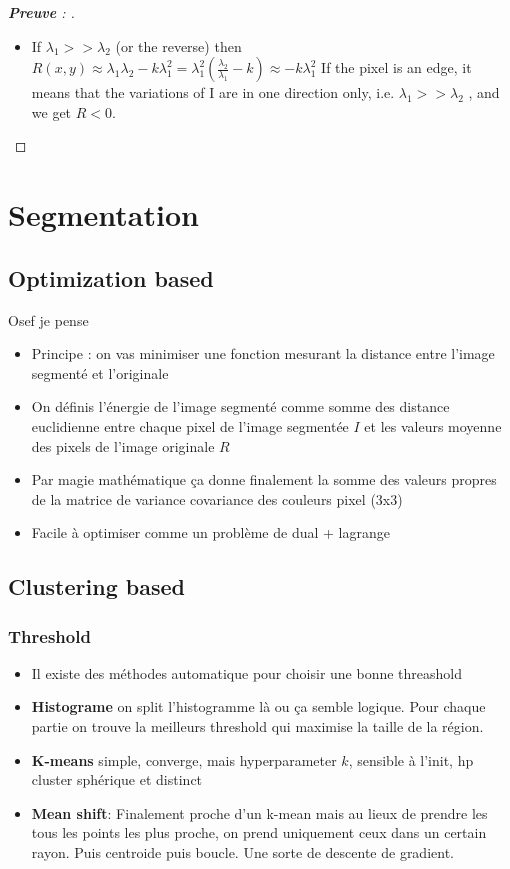 \documentclass{article}
\theoremstyle{plain}%
\theoremstyle{definition}
\theoremstyle{remark}
\begin{document}
\begin{proof}[\textbf{Preuve} : ]
\begin{itemize}
        \item If $ \lambda _1 >> \lambda _2 $  (or the reverse) then
        $ R(x,y) \approx \lambda _1 \lambda _2 - k \lambda _1^2 = \lambda _1^2 ( \frac{\lambda _2}{\lambda _1} - k) \approx - k \lambda _1^2$
        If the pixel is an edge, it means that the variations of I are in one direction only, i.e. $ \lambda _1 >> \lambda _2 $ , and we get $ R < 0 $.
    \end{itemize}
\end{proof}

\section{Segmentation}
\subsection{Optimization based}
Osef je pense 
\begin{itemize}
    \item Principe : on vas minimiser une fonction mesurant la distance entre l'image segmenté et l'originale
    \item On définis l'énergie de l'image segmenté comme somme des distance euclidienne entre chaque pixel de l'image segmentée $ I $  et les valeurs moyenne des pixels de l'image originale $ R $
    \item Par magie mathématique ça donne finalement la somme des valeurs propres de la matrice de variance covariance des couleurs pixel (3x3)
    \item Facile à optimiser comme un problème de dual + lagrange
\end{itemize}
\subsection{Clustering based}
\subsubsection{Threshold}
\begin{itemize}
    \item Il existe des méthodes automatique pour choisir une bonne threashold
    \item \textbf{Histograme} on split l'histogramme là ou ça semble logique. Pour chaque partie on trouve la meilleurs threshold qui maximise la taille de la région.
    \item \textbf{K-means} simple, converge, mais hyperparameter $ k $, sensible à l'init, hp cluster sphérique et distinct
    \item \textbf{Mean shift}: Finalement proche d'un k-mean mais au lieux de prendre les tous les points les plus proche, on prend uniquement ceux dans un certain rayon. Puis centroide puis boucle. Une sorte de descente de gradient.
\end{itemize}
\end{document}
